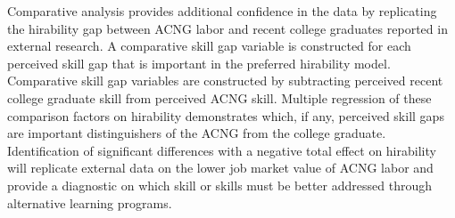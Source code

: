 \documentclass[review]{elsarticle}
\begin{document}
Comparative analysis provides additional confidence in the data by replicating the hirability gap between ACNG labor and recent college graduates reported in external research.
A comparative skill gap variable is constructed for each perceived skill gap that is important in the preferred hirability model.
Comparative skill gap variables are constructed by subtracting perceived recent college graduate skill from perceived ACNG skill.
Multiple regression of these comparison factors on hirability demonstrates which, if any, perceived skill gaps are important distinguishers of the ACNG from the college graduate.
Identification of significant differences with a negative total effect on hirability will replicate external data on the lower job market value of ACNG labor
and provide a diagnostic on which skill or skills must be better addressed through alternative learning programs.


\end{document}
